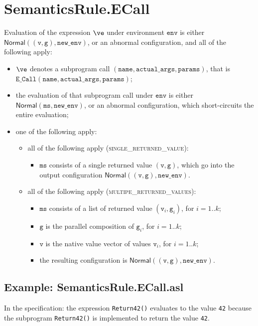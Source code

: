 \documentclass{book}
\newcommand\Normal[0]{\textsf{Normal}}
\newcommand\newenv[0]{\texttt{new\_env}}
\newcommand\env[0]{\texttt{env}}
\newcommand\vg[0]{\texttt{g}}
\newcommand\vv[0]{\texttt{v}}
\newcommand\vms[0]{\texttt{ms}}
\newcommand\name[0]{\texttt{name}}
\newcommand\actualargs[0]{\texttt{actual\_args}}
\newcommand\params[0]{\texttt{params}}
\begin{document}
\section{SemanticsRule.ECall \label{sec:SemanticsRule.ECall}}
  Evaluation of the expression $\ve$ under environment $\env$ is either $\Normal((\vv, \vg), \newenv)$,
  or an abnormal configuration, and all of the following apply:
  \begin{itemize}
    \item $\ve$ denotes a subprogram call $(\name, \actualargs, \params)$,
    that is \\ $\texttt{E\_Call}(\name, \actualargs, \params)$;
    \item the evaluation of that subprogram call under $\env$ is either
    $\Normal(\vms, \newenv)$, or an abnormal configuration,
    which short-circuits the entire evaluation;
    \item one of the following apply:
    \begin{itemize}
      \item all of the following apply (\textsc{single\_returned\_value}):
      \begin{itemize}
        \item $\vms$ consists of a single returned value $(\vv,\vg)$,
        which go into the output configuration $\Normal((\vv, \vg), \newenv)$.
      \end{itemize}

      \item all of the following apply (\textsc{multipe\_returned\_values}):
      \begin{itemize}
        \item $\vms$ consists of a list of returned value $(\vv_i,\vg_i)$, for $i=1..k$;
        \item $\vg$ is the parallel composition of $\vg_i$, for $i=1..k$;
        \item $\vv$ is the native value vector of values $\vv_i$, for $i=1..k$;
        \item the resulting configuration is $\Normal((\vv, \vg), \newenv)$.
      \end{itemize}
    \end{itemize}
  \end{itemize}

  \subsection{Example: SemanticsRule.ECall.asl}
    In the specification:
    the expression \texttt{Return42()} evaluates to the value \texttt{42} because the
    subprogram \texttt{Return42()} is implemented to return the value \texttt{42}.
\end{document}
